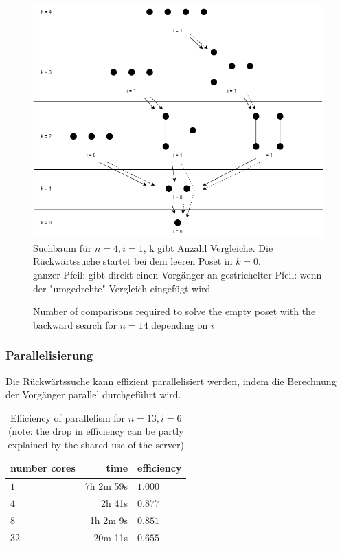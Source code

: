 \documentclass[10pt,journal,compsoc]{IEEEtran}
\begin{document}
\begin{figure}[h!]
  \centering
  \includegraphics[width=\columnwidth]{figures/backward-search-tree.png}
  \caption{Suchbaum für $n = 4, i = 1$, k gibt Anzahl Vergleiche. Die Rückwärtssuche startet bei dem leeren Poset in $k = 0$. \\
    ganzer Pfeil: gibt direkt einen Vorgänger an
    gestrichelter Pfeil: wenn der "umgedrehte" Vergleich eingefügt wird}
  \label{fig:backward-search-tree}
\end{figure}

\begin{figure}
  \centering
  
  \caption{Number of comparisons required to solve the empty poset with the backward search for $n = 14$ depending on $i$}
  \label{fig:backward-posets-per-level}
\end{figure}

\subsubsection{Parallelisierung} \label{sec:backward:parallelisation}
Die Rückwärtssuche kann effizient parallelisiert werden, indem die Berechnung der Vorgänger parallel durchgeführt wird.

\begin{table}
  \begin{tabular}{l|r|l}
    number cores & time      & efficiency \\
    \hline
    $1$          & 7h 2m 59s & $1.000$    \\
    $4$          & 2h 41s    & $0.877$    \\
    $8$          & 1h 2m 9s  & $0.851$    \\
    $32$         & 20m 11s   & $0.655$    \\
  \end{tabular}
  \centering
  \caption{Efficiency of parallelism for $n = 13, i = 6$ (note: the drop in efficiency can be partly explained by the shared use of the server)}
  \label{table:backward-parallel}
\end{table}
\end{document}
